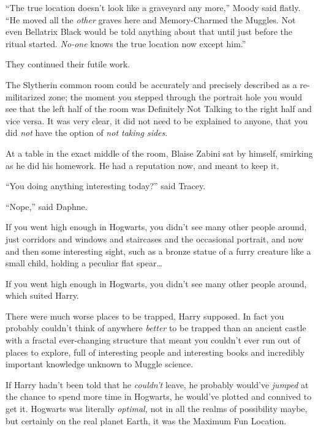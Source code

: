 “The true location doesn’t look like a graveyard any more,” Moody said flatly. “He moved all the \emph{other} graves here and Memory-Charmed the Muggles. Not even Bellatrix Black would be told anything about that until just before the ritual started. \emph{No-one} knows the true location now except him.”

They continued their futile work.


The Slytherin common room could be accurately and precisely described as a re-militarized zone; the moment you stepped through the portrait hole you would see that the left half of the room was Definitely Not Talking to the right half and vice versa. It was very clear, it did not need to be explained to anyone, that you did \emph{not} have the option of \emph{not taking sides}.

At a table in the exact middle of the room, Blaise Zabini sat by himself, smirking as he did his homework. He had a reputation now, and meant to keep it.


“You doing anything interesting today?” said Tracey.

“Nope,” said Daphne.


If you went high enough in Hogwarts, you didn’t see many other people around, just corridors and windows and staircases and the occasional portrait, and now and then some interesting sight, such as a bronze statue of a furry creature like a small child, holding a peculiar flat spear…

If you went high enough in Hogwarts, you didn’t see many other people around, which suited Harry.

There were much worse places to be trapped, Harry supposed. In fact you probably couldn’t think of anywhere \emph{better} to be trapped than an ancient castle with a fractal ever-changing structure that meant you couldn’t ever run out of places to explore, full of interesting people and interesting books and incredibly important knowledge unknown to Muggle science.

If Harry hadn’t been told that he \emph{couldn’t} leave, he probably would’ve \emph{jumped} at the chance to spend more time in Hogwarts, he would’ve plotted and connived to get it. Hogwarts was literally \emph{optimal,} not in all the realms of possibility maybe, but certainly on the real planet Earth, it was the Maximum Fun Location.

